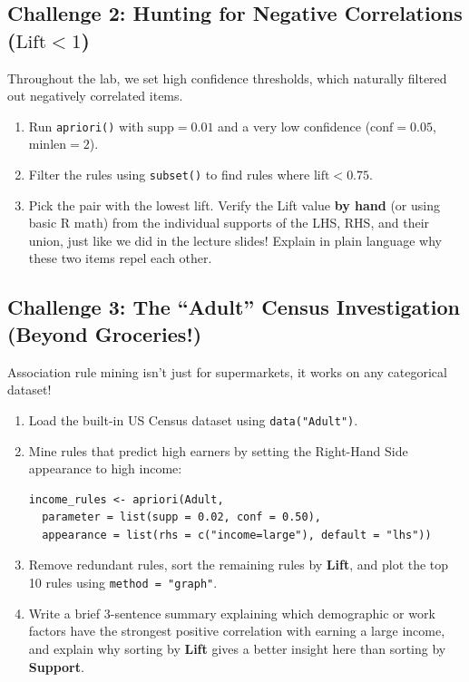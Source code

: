 \documentclass[11pt]{article}
\begin{document}
\subsection*{Challenge 2: Hunting for Negative Correlations ($\text{Lift} < 1$)}
Throughout the lab, we set high confidence thresholds, which naturally filtered out negatively correlated items.
\begin{enumerate}
    \item Run \texttt{apriori()} with $\text{supp} = 0.01$ and a very low confidence ($\text{conf} = 0.05$, $\text{minlen} = 2$).
    \item Filter the rules using \texttt{subset()} to find rules where $\text{lift} < 0.75$.
    \item Pick the pair with the lowest lift. Verify the Lift value \textbf{by hand} (or using basic R math) from the individual supports of the LHS, RHS, and their union, just like we did in the lecture slides! Explain in plain language why these two items repel each other.
\end{enumerate}

\subsection*{Challenge 3: The ``Adult'' Census Investigation (Beyond Groceries!)}
Association rule mining isn't just for supermarkets, it works on any categorical dataset!
\begin{enumerate}
    \item Load the built-in US Census dataset using \texttt{data("Adult")}.
    \item Mine rules that predict high earners by setting the Right-Hand Side appearance to high income:
\begin{lstlisting}
income_rules <- apriori(Adult, 
  parameter = list(supp = 0.02, conf = 0.50),
  appearance = list(rhs = c("income=large"), default = "lhs"))
\end{lstlisting}
    \item Remove redundant rules, sort the remaining rules by \textbf{Lift}, and plot the top 10 rules using \texttt{method = "graph"}.
    \item Write a brief 3-sentence summary explaining which demographic or work factors have the strongest positive correlation with earning a large income, and explain why sorting by \textbf{Lift} gives a better insight here than sorting by \textbf{Support}.
\end{enumerate}
\end{document}
